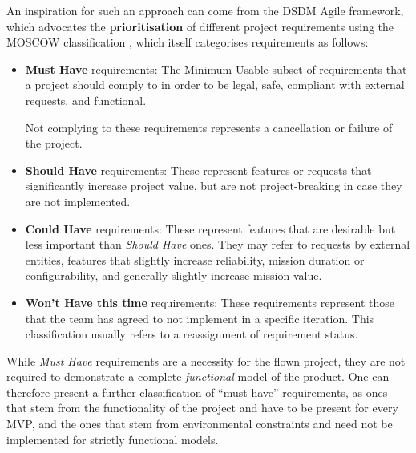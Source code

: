 \documentclass[a4paper,nobib,justified,final]{tufte-book}
\begin{document}
An inspiration for such an approach can come from the \acs{DSDM} Agile framework, which advocates the \textbf{prioritisation} of different project requirements using the \acf{MOSCOW} classification \autocite{agilebusinessconsortiumAgilePMHandbookV22014}, which itself categorises requirements as follows:
\begin{itemize}
	\item
	\textbf{Must Have} requirements: The Minimum Usable subset of requirements that a project should comply to in order to be legal, safe, compliant with external requests, and functional.
	
	Not complying to these requirements represents a cancellation or failure of the project.
	\item
	\textbf{Should Have} requirements: These represent features or requests that significantly increase project value, but are not project-breaking in case they are not implemented.
	\item \textbf{Could Have} requirements: These represent features that are desirable but less important than \emph{Should Have} ones. They may refer to requests by external entities, features that slightly increase reliability, mission duration or configurability, and generally slightly increase mission value.
	\item \textbf{Won't Have this time} requirements: These requirements represent those that the team has agreed to not implement in a specific iteration. This classification usually refers to a reassignment of requirement status.
\end{itemize}

While \emph{Must Have} requirements are a necessity for the flown project, they are not required to demonstrate a complete \emph{functional} model of the product. One can therefore present a further classification of ``must-have'' requirements, as ones that stem from the functionality of the project and have to be present for every \ac{MVP}, and the ones that stem from environmental constraints and need not be implemented for strictly functional models.
\end{document}
